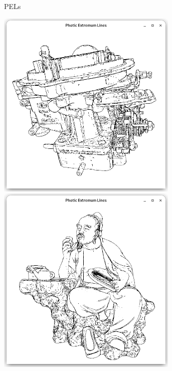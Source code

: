\documentclass[9pt,fleqn,twoside,twocolumn]{stdglobal}
\begin{document}
\begin{figure}
\begin{subfigure}[t]{0.19\textwidth}
        \caption{PELs}
      \end{subfigure}%
      \hfill
      \begin{subfigure}[t]{0.19\textwidth}
        \centering
        \includegraphics[width=0.95\textwidth,trim={15px 15 15 50},clip]{images/results/carburetor-contours-pel.png}
        \includegraphics[width=0.95\textwidth,trim={15px 15 15 50},clip]{images/results/luyu-contours-pel.png}

\end{subfigure}
\end{figure}
\end{document}

